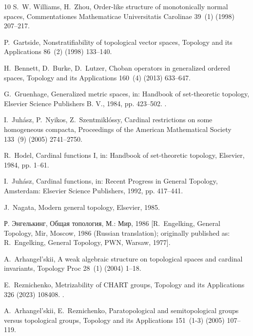 \documentclass[preprint]{elsarticle}
\theoremstyle{definition}
\theoremstyle{remark}
\begin{document}
\begin{thebibliography}{10}
S.~W. Williams, H.~Zhou, Order-like structure of monotonically normal spaces,
  Commentationes Mathematicae Universitatis Carolinae 39~(1) (1998) 207--217.

P.~Gartside, Nonstratifiability of topological vector spaces, Topology and its
  Applications 86~(2) (1998) 133--140.

H.~Bennett, D.~Burke, D.~Lutzer, Choban operators in generalized ordered
  spaces, Topology and its Applications 160~(4) (2013) 633--647.

G.~Gruenhage, Generalized metric spaces, in: Handbook of set-theoretic
  topology, Elsevier Science Publishers B. V., 1984, pp. 423--502.
\newblock \href {https://doi.org/10.1016/B978-0-444-86580-9.50013-6}
  {}.

I.~Juh{\'a}sz, P.~Nyikos, Z.~Szentmikl{\'o}ssy, Cardinal restrictions on some
  homogeneous compacta, Proceedings of the American Mathematical Society
  133~(9) (2005) 2741--2750.

R.~Hodel, {Cardinal functions I}, in: Handbook of set-theoretic topology,
  Elsevier, 1984, pp. 1--61.

I.~Juh{\'a}sz, Cardinal functions, in: Recent Progress in General Topology,
  Amsterdam: Elsevier Science Publishers, 1992, pp. 417--441.

J.~Nagata, Modern general topology, Elsevier, 1985.

Р. Энгелькинг, Общая топология, М.: Мир, 1986
[R.~Engelking, General Topology, Mir, Moscow, 1986 (Russian translation); originally published as: R.~Engelking, General Topology, PWN, Warsaw, 1977].

A.~Arhangel’skii, A weak algebraic structure on topological spaces and
  cardinal invariants, Topology Proc 28~(1) (2004) 1--18.

E.~Reznichenko, {Metrizability of CHART groups}, Topology and its Applications
  326 (2023) 108408.
\newblock \href {https://doi.org/10.1016/j.topol.2023.108408}
  {}.

A.~Arhangel'skii, E.~Reznichenko, Paratopological and semitopological groups
  versus topological groups, Topology and its Applications 151~(1-3) (2005)
  107--119.


\end{thebibliography}
\end{document}
